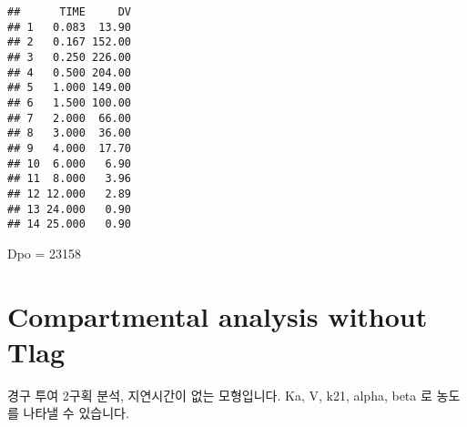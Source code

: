 \documentclass[
  9pt,
]{krantz}
\newenvironment{Shaded}{\begin{snugshade}}{\end{snugshade}}
\newcommand{\DecValTok}[1]{\textcolor[rgb]{0.00,0.00,0.81}{#1}}
\newcommand{\NormalTok}[1]{#1}
\newcommand{\StringTok}[1]{\textcolor[rgb]{0.31,0.60,0.02}{#1}}
\begin{document}
\begin{verbatim}
##      TIME     DV
## 1   0.083  13.90
## 2   0.167 152.00
## 3   0.250 226.00
## 4   0.500 204.00
## 5   1.000 149.00
## 6   1.500 100.00
## 7   2.000  66.00
## 8   3.000  36.00
## 9   4.000  17.70
## 10  6.000   6.90
## 11  8.000   3.96
## 12 12.000   2.89
## 13 24.000   0.90
## 14 25.000   0.90
\end{verbatim}

\begin{Shaded}
\begin{Highlighting}[]
\NormalTok{Dpo =}\StringTok{ }\DecValTok{23158}
\end{Highlighting}
\end{Shaded}

\hypertarget{compartmental-analysis-without-tlag-1}{%
\section{Compartmental analysis without Tlag}\label{compartmental-analysis-without-tlag-1}}

경구 투여 2구획 분석, 지연시간이 없는 모형입니다. Ka, V, k21, alpha, beta 로 농도를 나타낼 수 있습니다.
\end{document}
